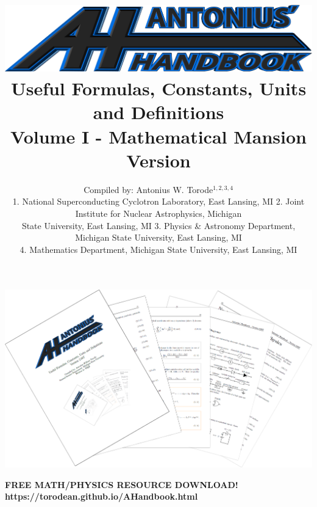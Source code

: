 \documentclass[openany,twoside, notitlepage,letterpaper,11pt]{book}
\title{\includegraphics[scale=.22]{./Images/Covers/AH2.png}
	\\ \vspace{1.5cm} Useful Formulas, Constants, Units and Definitions \\ Volume I - Mathematical Mansion \\ Version \Version}
\date{}
\author{Compiled by: Antonius W. Torode$^{1,2,3,4}$ \\ \scriptsize{1. National Superconducting Cyclotron Laboratory, East Lansing, MI 2. Joint Institute for Nuclear Astrophysics, Michigan} \\ \scriptsize{State University, East Lansing, MI 3. Physics \& Astronomy Department, Michigan State University, East Lansing, MI} \\ \scriptsize{4. Mathematics Department, Michigan State University, East Lansing, MI}}
\begin{document}
\frontmatter
\maketitle
\thispagestyle{empty}
\pagestyle{empty}
\begin{center}
	\includegraphics[scale=1.8]{./Images/Covers/background_tunnel.png}
	
{\Large \textbf{FREE MATH/PHYSICS RESOURCE DOWNLOAD!}\\ \textbf{https://torodean.github.io/AHandbook.html} }
\end{center}
\end{document}
